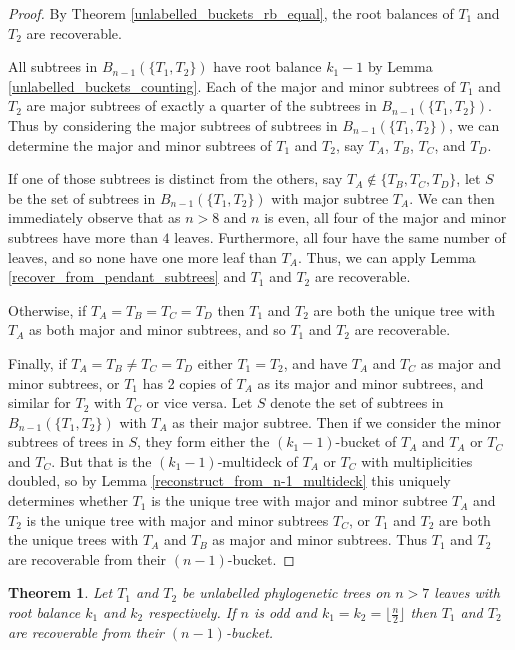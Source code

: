 \documentclass[12pt]{article}
\newtheorem{Theorem}{Theorem}[section]
\theoremstyle{definition}
\begin{document}
\begin{proof}
    By Theorem \ref{unlabelled_buckets_rb_equal}, the root balances of $T_1$ and $T_2$ are recoverable. 
    
    All subtrees in $B_{n-1}(\{T_1, T_2\})$ have root balance $k_1-1$ by Lemma \ref{unlabelled_buckets_counting}. Each of the major and minor subtrees of $T_1$ and $T_2$ are major subtrees of exactly a quarter of the subtrees in $B_{n-1}(\{T_1, T_2\})$. Thus by considering the major subtrees of subtrees in $B_{n-1}(\{T_1, T_2\})$, we can determine the major and minor subtrees of $T_1$ and $T_2$, say $T_A$, $T_B$, $T_C$, and $T_D$.
    
    If one of those subtrees is distinct from the others, say $T_A \notin \{T_B, T_C, T_D\}$, let $S$ be the set of subtrees in $B_{n-1}(\{T_1, T_2\})$ with major subtree $T_A$. We can then immediately observe that as $n>8$ and $n$ is even, all four of the major and minor subtrees have more than $4$ leaves. Furthermore, all four have the same number of leaves, and so none have one more leaf than $T_A$. Thus, we can apply Lemma \ref{recover_from_pendant_subtrees} and $T_1$ and $T_2$ are recoverable.
    
    Otherwise, if $T_A = T_B = T_C = T_D$ then $T_1$ and $T_2$ are both the unique tree with $T_A$ as both major and minor subtrees, and so $T_1$ and $T_2$ are recoverable.
    
    Finally, if $T_A = T_B \neq T_C = T_D$ either $T_1=T_2$, and have $T_A$ and $T_C$ as major and minor subtrees, or $T_1$ has 2 copies of $T_A$ as its major and minor subtrees, and similar for $T_2$ with $T_C$ or vice versa. Let $S$ denote the set of subtrees in $B_{n-1}(\{T_1, T_2\})$ with $T_A$ as their major subtree. Then if we consider the minor subtrees of trees in $S$, they form either the $(k_1-1)$-bucket of $T_A$ and $T_A$ or $T_C$ and $T_C$. But that is the $(k_1-1)$-multideck of $T_A$ or $T_C$ with multiplicities doubled, so by Lemma \ref{reconstruct_from_n-1_multideck} this uniquely determines whether $T_1$ is the unique tree with major and minor subtree $T_A$ and $T_2$ is the unique tree with major and minor subtrees $T_C$, or $T_1$ and $T_2$ are both the unique trees with $T_A$ and $T_B$ as major and minor subtrees. Thus $T_1$ and $T_2$ are recoverable from their $(n-1)$-bucket.
\end{proof}

\begin{Theorem}\label{unlabelled_buckets_theorem3.5}
    Let $T_1$ and $T_2$ be unlabelled phylogenetic trees on $n>7$ leaves with root balance $k_1$ and $k_2$ respectively. If $n$ is odd and $k_1 = k_2 = \lfloor\frac{n}{2}\rfloor$ then $T_1$ and $T_2$ are recoverable from their $(n-1)$-bucket.
\end{Theorem}
\end{document}
